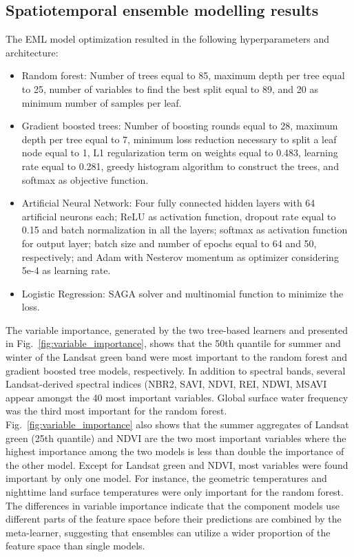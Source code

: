 \subsection*{Spatiotemporal ensemble modelling results}

    The EML model optimization resulted in the following hyperparameters and architecture:
    \begin{itemize}
    \item Random forest: Number of trees equal to 85, maximum depth per tree equal to 25, number of variables to find the best split equal to 89, and 20 as minimum number of samples per leaf.  
    \item Gradient boosted trees:  Number of boosting rounds equal to 28, maximum depth per tree equal to 7, minimum loss reduction necessary to split a leaf node equal to 1, L1 regularization term on weights equal to 0.483, learning rate equal to 0.281, greedy histogram algorithm to construct the trees, and \textsf{softmax} as objective function. 
    \item Artificial Neural Network: Four fully connected hidden layers with 64 artificial neurons each; \textsf{ReLU} as activation function,  dropout rate equal to 0.15 and batch normalization in all the layers;  \textsf{softmax} as activation function for output layer; batch size and number of epochs equal to 64 and 50, respectively; and Adam with Nesterov momentum as optimizer considering  5e-4 as learning rate.
    \item Logistic Regression: SAGA solver and multinomial function to minimize the loss.
    \end{itemize}

    The variable importance, generated by the two tree-based learners and presented in Fig.\@~\ref{fig:variable_importance}, shows that the 50th quantile for summer and winter of the Landsat green band were most important to the random forest and gradient boosted tree models, respectively. In addition to spectral bands, several Landsat-derived spectral indices (NBR2, SAVI, NDVI, REI, NDWI, MSAVI appear amongst the 40 most important variables. Global surface water frequency was the third most important for the random forest. Fig.\@~\ref{fig:variable_importance} also shows that the summer aggregates of Landsat green (25th quantile) and NDVI are the two most important variables where the highest importance among the two models is less than double the importance of the other model. Except for Landsat green and NDVI, most variables were found important by only one model. For instance, the geometric temperatures and nighttime land surface temperatures were only important for the random forest. The differences in variable importance indicate that the component models use different parts of the feature space before their predictions are combined by the meta-learner, suggesting that ensembles can utilize a wider proportion of the feature space than single models.
    
